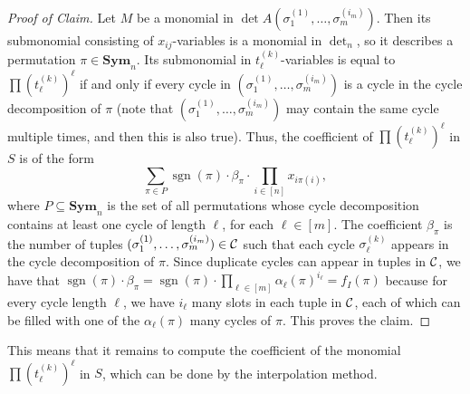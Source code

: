 \documentclass[10pt,a4paper]{article}
\theoremstyle{definition}
\theoremstyle{plain}
\theoremstyle{remark}
\newenvironment{claimproof}[1][Proof of Claim]{\begin{proof}[#1] \renewcommand{\qedsymbol}{$\lrcorner$}}{ \end{proof}}
\newcommand{\Cc}{{\cal C}}
\newcommand{\Sym}{\mathbf{Sym}}
\DeclareMathOperator{\sgn}{sgn}
\begin{document}
\begin{claimproof} Let $M$ be a monomial in $\det A(\sigma_1^{(1)},\dots ,\sigma_{m}^{(i_m)})$. Then its submonomial consisting of $x_{ij}$-variables is a monomial in $\det_n$, so it describes a permutation $\pi \in \Sym_n$. Its submonomial in $t_\ell^{(k)}$-variables is equal to $\prod (t_\ell^{(k)})^\ell$ if and only if every cycle in $(\sigma_1^{(1)},\dots ,\sigma_{m}^{(i_m)})$ is a cycle in the cycle decomposition of $\pi$ (note that $(\sigma_1^{(1)},\dots ,\sigma_{m}^{(i_m)})$ may contain the same cycle multiple times, and then this is also true). 
Thus, the coefficient of $\prod (t_\ell^{(k)})^\ell$ in $S$ is of the form
\[
\sum_{\pi \in P}  \sgn(\pi) \cdot \beta_{\pi} \cdot \prod_{i \in [n]} x_{i\pi(i)},  
\]
where $P \subseteq \Sym_n$ is the set of all permutations whose cycle decomposition contains at least one cycle of length $\ell$, for each $\ell \in [m]$. The coefficient $\beta_\pi$ is the number of tuples 
$(\sigma_1^{(1)},\dots ,\sigma_{m}^{(i_m)}) \in \Cc$ such that each cycle $\sigma_\ell^{(k)}$ appears in the cycle decomposition of $\pi$. Since duplicate cycles can appear in tuples in $\Cc$, we have that $\sgn(\pi) \cdot \beta_\pi = \sgn(\pi) \cdot \prod_{\ell \in [m]} \alpha_\ell(\pi)^{i_\ell} = f_I(\pi)$ because for every cycle length $\ell$, we have $i_\ell$ many slots in each tuple in $\Cc$, each of which can be filled with one of the $\alpha_\ell(\pi)$ many cycles of $\pi$. This proves the claim.
\end{claimproof}

This means that it remains to compute the coefficient of the monomial $\prod (t_\ell^{(k)})^\ell$ in $S$, which can be done by the interpolation method.\\
\end{document}
